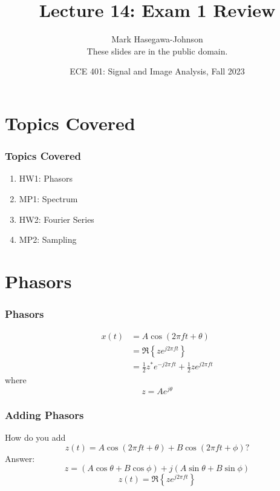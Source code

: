 \documentclass{beamer}
\title{Lecture 14: Exam 1 Review}
\author{Mark Hasegawa-Johnson\\These slides are in the public domain.}
\date{ECE 401: Signal and Image Analysis, Fall 2023}
\begin{document}
\begin{frame}
  \maketitle
\end{frame}

\begin{frame}
  \tableofcontents
\end{frame}

\section[Topics]{Topics Covered}
\setcounter{subsection}{1}

\begin{frame}
  \frametitle{Topics Covered}

  \begin{enumerate}
  \item HW1: Phasors
  \item MP1: Spectrum
  \item HW2: Fourier Series
  \item MP2: Sampling
  \end{enumerate}
\end{frame}

\section[Phasors]{Phasors}
\setcounter{subsection}{1}

\begin{frame}
  \frametitle{Phasors}

  \begin{align*}
    x(t) &= A \cos\left(2\pi f t+\theta\right) \\
    &= \Re\left\{ze^{j2\pi ft}\right\}\\
    &= \frac{1}{2}z^*e^{-j2\pi ft} + \frac{1}{2}z e^{j2\pi ft}
  \end{align*}
  where
  \[
  z = Ae^{j\theta}
  \]
\end{frame}

\begin{frame}
  \frametitle{Adding Phasors}

  How do you add
  \[
  z(t) = A\cos\left(2\pi ft+\theta\right) + B\cos\left(2\pi ft+\phi\right)?
  \]
  Answer:
  \[
  z = (A\cos\theta+B\cos\phi) + j(A\sin\theta+B\sin\phi)
  \]
  \[
  z(t) = \Re\left\{z e^{j2\pi ft}\right\}
  \]
\end{frame}
\end{document}

